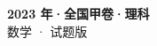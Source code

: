 \documentclass[zihao=-4, a4paper]{ctexart}
\begin{document}
\begin{center}
  {\Large\bfseries 2023 年·全国甲卷·理科}\\[4pt]
  {\large 数学 · 试题版}
\end{center}
\medskip
{}

\end{document}
